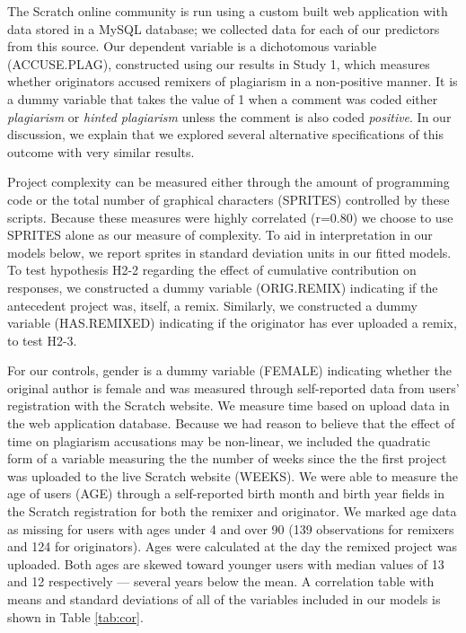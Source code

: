 
The Scratch online community is run using a custom built web application
with data stored in a MySQL database; we collected data for each of our
predictors from this source. Our dependent variable is a dichotomous
variable (ACCUSE.PLAG), constructed using our results in Study 1, which
measures whether originators accused remixers of plagiarism in a
non-positive manner. It is a dummy variable that takes the value of 1
when a comment was coded either {\em plagiarism} or {\em hinted
plagiarism} unless the comment is also coded {\em positive}. In our
discussion, we explain that we explored several alternative
specifications of this outcome with very similar results. 

Project complexity can be measured either through the amount of
programming code or the total number of graphical characters (SPRITES)
controlled by these scripts. Because these measures were highly
correlated (r=0.80) we choose to use SPRITES alone as our measure of
complexity. To aid in interpretation in our models below, we report
sprites in standard deviation units in our fitted models. To test
hypothesis H2-2 regarding the effect of cumulative contribution on
responses, we constructed a dummy variable (ORIG.REMIX) indicating if
the antecedent project was, itself, a remix. Similarly, we constructed a
dummy variable (HAS.REMIXED) indicating if the originator has ever
uploaded a remix, to test H2-3.

For our controls, gender is a dummy variable (FEMALE) indicating whether
the original author is female and was measured through self-reported
data from users' registration with the Scratch website. We measure time
based on upload data in the web application database. Because we had
reason to believe that the effect of time on plagiarism accusations may
be non-linear, we included the quadratic form of a variable measuring
the the number of weeks since the the first project was uploaded to the
live Scratch website (WEEKS).  We were able to measure the age of users
(AGE) through a self-reported birth month and birth year fields in the
Scratch registration for both the remixer and originator. We marked
age data as missing for users with ages under 4 and over 90 (139
observations for remixers and 124 for originators). Ages were calculated
at the day the remixed project was uploaded. Both ages are skewed toward
younger users with median values of 13 and 12 respectively --- several
years below the mean. A correlation table with means and standard deviations 
of all of the variables
included in our models is shown in Table \ref{tab:cor}.

